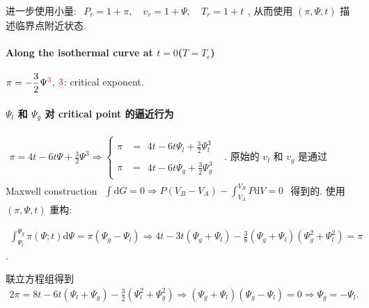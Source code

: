 \documentclass[../../main.tex]{subfiles}
\begin{document}
进一步使用小量: $\begin{aligned}
    P_{r} = 1 + \pi,\quad v_{r} = 1 + \Psi, \quad T_{r} = 1 + t
\end{aligned}$, 从而使用 $(\pi,\Psi,t)$ 描述临界点附近状态.

\paragraph{Along the isothermal curve at $t=0$($T=T_{c}$)}

$\begin{aligned}
    \pi = -\frac{3}{2}\Psi^{{\color{red}{3}}}
\end{aligned}$, ${\color{red}{3}}$: critical exponent. 

\paragraph{$\Psi_{l}$ 和 $\Psi_{g}$ 对 critical point 的逼近行为}
$\begin{aligned}
    \pi = 4t - 6t\Psi + \frac{3}{2}\Psi^{3}\Rightarrow \left\{\begin{aligned}
            \pi &= \begin{aligned}
                4t - 6t\Psi_{l} + \frac{3}{2}\Psi_{l}^{3}
            \end{aligned}\\
            \pi &= \begin{aligned}
                4t - 6t\Psi_{g} + \frac{3}{2}\Psi_{g}^{3}
            \end{aligned}
    \end{aligned}\right.
\end{aligned}$. 原始的 $v_{l}$ 和 $v_{g}$ 是通过 Maxwell construction $\begin{aligned}
    \int \mathrm{d}G = 0\Rightarrow P(V_{B}-V_{A}) - \int_{V_{A}}^{V_{B}}P\mathrm{d}V = 0
\end{aligned}$ 得到的. 使用 $(\pi,\Psi,t)$ 重构: 

$\begin{aligned}
    \int_{\Psi_{l}}^{\Psi_{g}}\pi(\Psi;t)\mathrm{d}\Psi = \pi(\Psi_{g}-\Psi_{l}) \Rightarrow 4t - 3t(\Psi_{g}+\Psi_{l}) - \frac{3}{8}(\Psi_{g} + \Psi_{l})(\Psi_{g}^{2}+\Psi_{l}^{2}) = \pi
\end{aligned}$. 

联立方程组得到 $\begin{aligned}
    2\pi = 8t-6t(\Psi_{l}+\Psi_{g}) - \frac{3}{2}\left(\Psi_{l}^{2}+\Psi_{g}^{2}\right)\Rightarrow (\Psi_{g}+\Psi_{l})(\Psi_{g}-\Psi_{l}) = 0\Rightarrow \Psi_{g} = -\Psi_{l}.
\end{aligned}$ 
\end{document}
